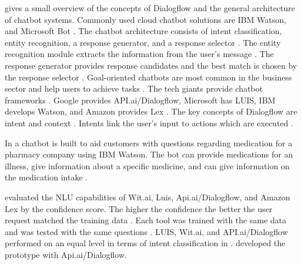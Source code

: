 \citet{rahman2017programming} gives a small overview of the concepts of Dialogflow and the general architecture of chatbot systems.
Commonly used cloud chatbot solutions are IBM Watson, and Microsoft Bot \cite{rahman2017programming}.
The chatbot architecture consists of intent classification, entity recognition, a response generator, and a response selector \cite{rahman2017programming}. 
The entity recognition module extracts the information from the user's message \cite{rahman2017programming}.
The response generator provides response candidates and the best match is chosen by the response selector \cite{rahman2017programming}.
Goal-oriented chatbots are most common in the business sector and help users to achieve tasks \cite{rahman2017programming}.
The tech giants provide chatbot frameworks \cite{rahman2017programming}. Google provides API.ai/Dialogflow, Microsoft has LUIS, IBM develops Watson, and Amazon provides Lex \cite{rahman2017programming}.
The key concepts of Dialogflow are intent and context \cite{rahman2017programming}.
Intents link the user's input to actions which are executed \cite{rahman2017programming}.

In \citet{pharmacybot} a chatbot is built to aid customers with questions regarding medication for a pharmacy company using IBM Watson.
The bot can provide medications for an illness, give information about a specific medicine, and can give information on the medication intake \cite{pharmacybot}.

\citet{gregori2017evaluation} evaluated the NLU capabilities of Wit.ai, Luis, Api.ai/Dialogflow, and Amazon Lex
by the confidence score. The higher the confidence the better the user request matched the training data \citet{gregori2017evaluation}.
Each tool was trained with the same data and was tested with the same questions \citet{gregori2017evaluation}.
LUIS, Wit.ai, and API.ai/Dialogflow performed on an equal level in terms of intent classification in \citet{gregori2017evaluation}.
\citet{gregori2017evaluation} developed the prototype with Api.ai/Dialogflow.

